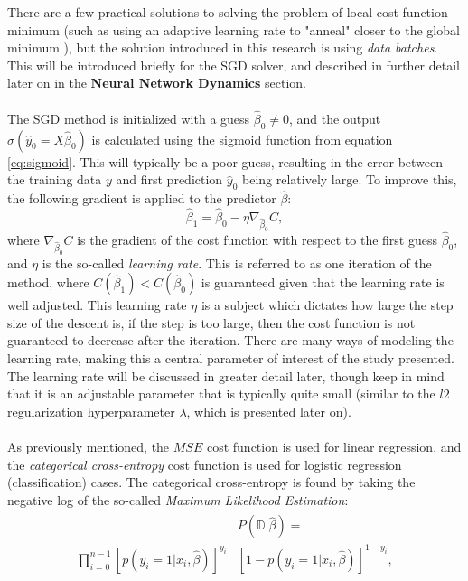             There are a few practical solutions to solving the problem of local cost function minimum (such as using an adaptive learning rate to "anneal" closer to the global minimum \cite{stackexchangeminimum}), but the solution introduced in this research is using \textit{data batches}. This will be introduced briefly for the SGD solver, and described in further detail later on in the \textbf{Neural Network Dynamics} section.\\\\
            The SGD method is initialized with a guess $\hat{\beta}_0 \neq 0$, and the output $\sigma(\hat{y}_0=X\hat{\beta}_0)$ is calculated using the sigmoid function from equation \ref{eq:sigmoid}. This will typically be a poor guess, resulting in the error between the training data $y$ and first prediction $\hat{y}_0$ being relatively large. To improve this, the following gradient is applied to the predictor $\hat{\beta}$:
            \begin{equation}
                \hat{\beta}_1 = \hat{\beta}_0 - \eta \nabla_{\hat{\beta}_0}C,
            \end{equation}
            where $\nabla_{\hat{\beta}_0}C$ is the gradient of the cost function with respect to the first guess $\hat{\beta}_0$, and $\eta$ is the so-called \textit{learning rate}. This is referred to as one iteration of the method, where $C(\hat{\beta}_1) < C(\hat{\beta}_0)$ is guaranteed given that the learning rate is well adjusted. This learning rate $\eta$ is a subject which dictates how large the step size of the descent is, if the step is too large, then the cost function is not guaranteed to decrease after the iteration. There are many ways of modeling the learning rate, making this a central parameter of interest of the study presented. The learning rate will be discussed in greater detail later, though keep in mind that it is an adjustable parameter that is typically quite small (similar to the $l2$ regularization hyperparameter $\lambda$, which is presented later on).\\\\
            As previously mentioned, the $MSE$ cost function is used for linear regression, and the \textit{categorical cross-entropy} cost function is used for logistic regression (classification) cases. The categorical cross-entropy is found by taking the negative log of the so-called \textit{Maximum Likelihood Estimation}:
            \begin{align}
                \begin{split}
                    &P(\mathds{D}|\hat{\beta}) =\\ \prod^{n-1}_{i=0} \left[ p(y_i=1|x_i, \hat{\beta}) \right]^{y_i}&\left[ 1-p(y_i=1|x_i, \hat{\beta}) \right]^{1-y_i},
                \end{split}
            \end{align}
